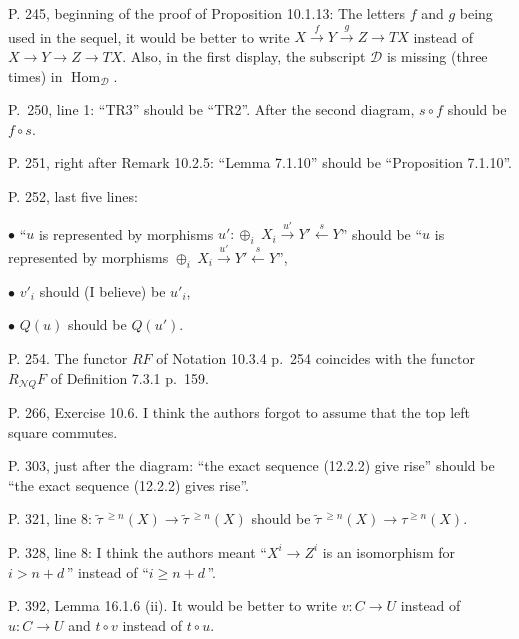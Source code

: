 \documentclass[12pt]{article}
\theoremstyle{remark}
\theoremstyle{definition}
\newcommand{\bu}{\bullet}
\newcommand{\cc}{\mathcal}
\newcommand{\C}{\mathcal C}
\newcommand{\xr}{\xrightarrow}
\DeclareMathOperator{\Hom}{Hom}%
\begin{document}
\noindent P. 245, beginning of the proof of Proposition 10.1.13: The letters $f$ and $g$ being used in the sequel, it would be better to write $X\xr fY\xr gZ\to TX$ instead of $X\to Y\to Z\to TX$. Also, in the first display, the subscript $\cc D$ is missing (three times) in $\Hom_{\cc D}$.

\noindent P.~250, line 1: ``TR3'' should be ``TR2''. After the second diagram, $s\circ f$ should be $f\circ s$.

\noindent P. 251, right after Remark 10.2.5: ``Lemma 7.1.10'' should be ``Proposition 7.1.10''.

\noindent P. 252, last five lines:

$\bu$ ``$u$ is represented by morphisms $u':\oplus_i\ X_i\xr{u'}Y'\xleftarrow sY$'' should be ``$u$ is represented by morphisms $\oplus_i\ X_i\xr{u'}Y'\xleftarrow sY$'', 

$\bu$ $v'_i$ should (I believe) be $u'_i$, 


$\bu$ $Q(u)$ should be $Q(u')$. 

\noindent P. 254. The functor $RF$ of Notation 10.3.4 p.~254 coincides with the functor $R_{\cc NQ}F$ of Definition 7.3.1 p.~159.

\noindent P. 266, Exercise 10.6. I think the authors forgot to assume that the top left square commutes.


\noindent P. 303, just after the diagram: ``the exact sequence (12.2.2) give rise'' should be ``the exact sequence (12.2.2) gives rise''.

\noindent P. 321, line 8: $\widetilde\tau\,{}^{\ge n}(X)\to\widetilde\tau\,{}^{\ge n}(X)$ should be $\widetilde\tau\,{}^{\ge n}(X)\to\tau^{\ge n}(X)$.


\noindent P. 328, line 8: I think the authors meant ``$X^i\to Z^i$ is an isomorphism for $i>n+d\,$'' instead of ``$i\ge n+d\,$''. 

\noindent P. 392, Lemma 16.1.6 (ii). It would be better to write $v:C\to U$ instead of $u:C\to U$ and $t\circ v$ instead of $t\circ u$. 
\end{document}
